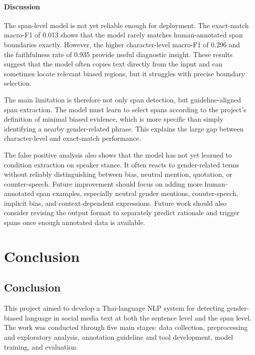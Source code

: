 \documentclass[12pt,oneside,openright,a4paper]{cpe-english-project}
\begin{document}
\subsubsection{Discussion}

The span-level model is not yet reliable enough for deployment. The exact-match macro-F1 of 0.013 shows that the model rarely matches human-annotated span boundaries exactly. However, the higher character-level macro-F1 of 0.296 and the faithfulness rate of 0.935 provide useful diagnostic insight. These results suggest that the model often copies text directly from the input and can sometimes locate relevant biased regions, but it struggles with precise boundary selection.

The main limitation is therefore not only span detection, but guideline-aligned span extraction. The model must learn to select spans according to the project's definition of minimal biased evidence, which is more specific than simply identifying a nearby gender-related phrase. This explains the large gap between character-level and exact-match performance.

The false positive analysis also shows that the model has not yet learned to condition extraction on speaker stance. It often reacts to gender-related terms without reliably distinguishing between bias, neutral mention, quotation, or counter-speech. Future improvement should focus on adding more human-annotated span examples, especially neutral gender mentions, counter-speech, implicit bias, and context-dependent expressions. Future work should also consider revising the output format to separately predict rationale and trigger spans once enough annotated data is available.

\chapter{Conclusion}

\section{Conclusion}

This project aimed to develop a Thai-language NLP system for detecting gender-biased language in social media text at both the sentence level and the span level. The work was conducted through five main stages: data collection, preprocessing and exploratory analysis, annotation guideline and tool development, model training, and evaluation.
\end{document}
